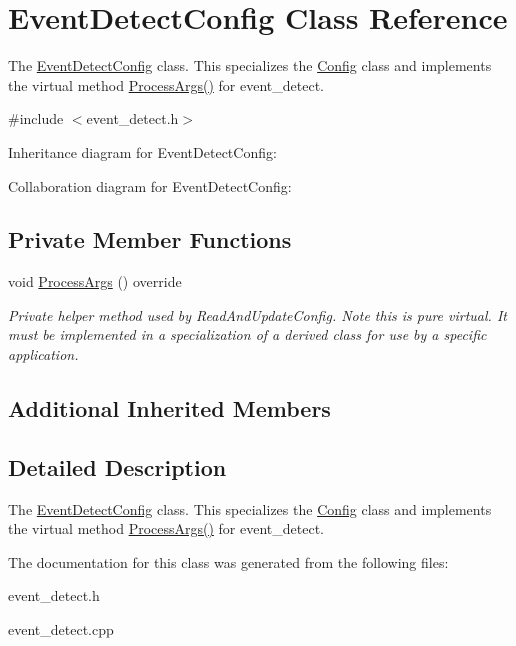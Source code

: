 \hypertarget{classEventDetectConfig}{}\section{Event\+Detect\+Config Class Reference}
\label{classEventDetectConfig}


The \mbox{\hyperlink{classEventDetectConfig}{Event\+Detect\+Config}} class. This specializes the \mbox{\hyperlink{classConfig}{Config}} class and implements the virtual method \mbox{\hyperlink{classEventDetectConfig_a1f46e37c41cc2ac75463aed99788d3d7}{Process\+Args()}} for event\+\_\+detect.  




{\ttfamily \#include $<$event\+\_\+detect.\+h$>$}



Inheritance diagram for Event\+Detect\+Config\+:


Collaboration diagram for Event\+Detect\+Config\+:
\subsection*{Private Member Functions}
\begin{DoxyCompactItemize}
\item 
\mbox{\label{classEventDetectConfig_a1f46e37c41cc2ac75463aed99788d3d7}} 
void \mbox{\hyperlink{classEventDetectConfig_a1f46e37c41cc2ac75463aed99788d3d7}{Process\+Args}} () override
\begin{DoxyCompactList}\small\item\em Private helper method used by Read\+And\+Update\+Config. Note this is pure virtual. It must be implemented in a specialization of a derived class for use by a specific application. \end{DoxyCompactList}\end{DoxyCompactItemize}
\subsection*{Additional Inherited Members}


\subsection{Detailed Description}
The \mbox{\hyperlink{classEventDetectConfig}{Event\+Detect\+Config}} class. This specializes the \mbox{\hyperlink{classConfig}{Config}} class and implements the virtual method \mbox{\hyperlink{classEventDetectConfig_a1f46e37c41cc2ac75463aed99788d3d7}{Process\+Args()}} for event\+\_\+detect. 

The documentation for this class was generated from the following files\+:\begin{DoxyCompactItemize}
\item 
event\+\_\+detect.\+h\item 
event\+\_\+detect.\+cpp\end{DoxyCompactItemize}
